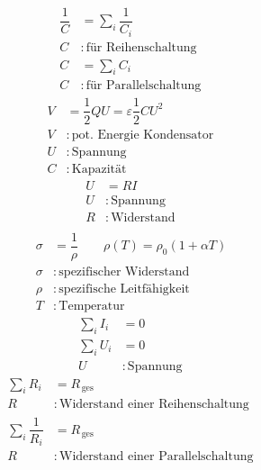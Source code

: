\documentclass[a4paper,12pt]{article}
\numberwithin{equation}{section}
\begin{document}
\begin{align} 
        \dfrac{1}{C}&=\sum_{i}^{}\dfrac{1}{C_i}\\
        C&:\,\text{für Reihenschaltung}\,\nonumber \\
        C&=\sum_{i}^{}C_i\\
        C&:\,\text{für Parallelschaltung}\,\nonumber 
\end{align} 
\begin{align} 
        V&=\dfrac{1}{2}QU=\varepsilon \dfrac{1}{2}CU^2\\
        V&:\,\text{pot.\ Energie Kondensator}\,\nonumber \\
        U&:\,\text{Spannung}\,\nonumber \\
        C&:\,\text{Kapazität}\,\nonumber 
\end{align} 
\begin{align} 
        U&=RI\\
        U&:\,\text{Spannung}\,\nonumber \\
        R&:\,\text{Widerstand}\,\nonumber \\
\end{align} 
\begin{align} 
        \sigma &=\dfrac{1}{\rho }\qquad \rho \left(T\right)=\rho _0\left(1+\alpha T\right)\\
        \sigma &:\,\text{spezifischer Widerstand}\,\nonumber \\
        \rho &:\,\text{spezifische Leitfähigkeit}\,\nonumber \\
        T&:\,\text{Temperatur}\,
\end{align} 
\begin{align} 
        \sum_{i}^{}I_i&=0\\
        \sum_{i}^{}U_i&=0\\
        U&:\,\text{Spannung}\,\nonumber 
\end{align} 
\begin{align} 
        \sum_{i}^{}R_i&=R_{\,\text{ges}\,}\\
        R&:\,\text{Widerstand einer Reihenschaltung}\,\nonumber \\
        \sum_{i}^{}\dfrac{1}{R_i}&=R_{\,\text{ges}\,}\\
        R&:\,\text{Widerstand einer Parallelschaltung}\,\nonumber 
\end{align} 




\newpage

\end{document}
